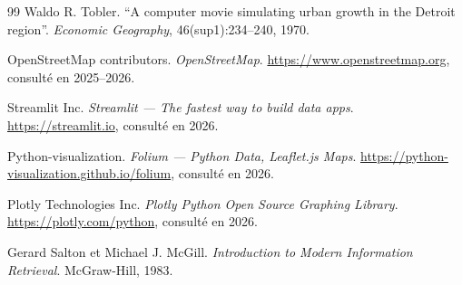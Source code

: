 \documentclass[11pt,a4paper,twoside]{report}
\begin{document}
\begin{thebibliography}{99}
Waldo R. Tobler. ``A computer movie simulating urban growth in the Detroit region''.
\textit{Economic Geography}, 46(sup1):234--240, 1970.

OpenStreetMap contributors. \textit{OpenStreetMap}.
\url{https://www.openstreetmap.org}, consulté en 2025--2026.

Streamlit Inc. \textit{Streamlit --- The fastest way to build data apps}.
\url{https://streamlit.io}, consulté en 2026.

Python-visualization. \textit{Folium --- Python Data, Leaflet.js Maps}.
\url{https://python-visualization.github.io/folium}, consulté en 2026.

Plotly Technologies Inc. \textit{Plotly Python Open Source Graphing Library}.
\url{https://plotly.com/python}, consulté en 2026.

Gerard Salton et Michael J. McGill.
\textit{Introduction to Modern Information Retrieval}.
McGraw-Hill, 1983.

\end{thebibliography}
\end{document}
